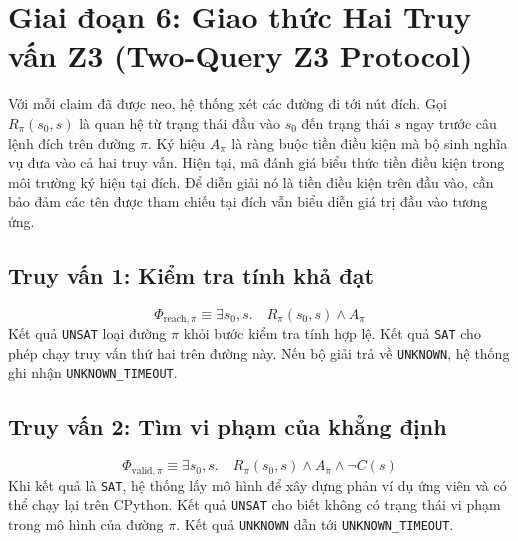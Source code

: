 \section{Giai đoạn 6: Giao thức Hai Truy vấn Z3 (Two-Query Z3 Protocol)}
\label{sec:two_query_protocol}

Với mỗi claim đã được neo, hệ thống xét các đường đi tới nút đích. Gọi $R_\pi(s_0,s)$ là quan hệ từ trạng thái đầu vào $s_0$ đến trạng thái $s$ ngay trước câu lệnh đích trên đường $\pi$. Ký hiệu $A_\pi$ là ràng buộc tiền điều kiện mà bộ sinh nghĩa vụ đưa vào cả hai truy vấn. Hiện tại, mã đánh giá biểu thức tiền điều kiện trong môi trường ký hiệu tại đích. Để diễn giải nó là tiền điều kiện trên đầu vào, cần bảo đảm các tên được tham chiếu tại đích vẫn biểu diễn giá trị đầu vào tương ứng.

\subsection{Truy vấn 1: Kiểm tra tính khả đạt}
\begin{equation}
\Phi_{\text{reach},\pi} \equiv \exists s_0,s.\quad R_\pi(s_0,s) \land A_\pi
\end{equation}
Kết quả \texttt{UNSAT} loại đường $\pi$ khỏi bước kiểm tra tính hợp lệ. Kết quả \texttt{SAT} cho phép chạy truy vấn thứ hai trên đường này. Nếu bộ giải trả về \texttt{UNKNOWN}, hệ thống ghi nhận \texttt{UNKNOWN\_TIMEOUT}.

\subsection{Truy vấn 2: Tìm vi phạm của khẳng định}
\begin{equation}
\Phi_{\text{valid},\pi} \equiv \exists s_0,s.\quad R_\pi(s_0,s) \land A_\pi \land \neg C(s)
\end{equation}
Khi kết quả là \texttt{SAT}, hệ thống lấy mô hình để xây dựng phản ví dụ ứng viên và có thể chạy lại trên CPython. Kết quả \texttt{UNSAT} cho biết không có trạng thái vi phạm trong mô hình của đường $\pi$. Kết quả \texttt{UNKNOWN} dẫn tới \texttt{UNKNOWN\_TIMEOUT}.

